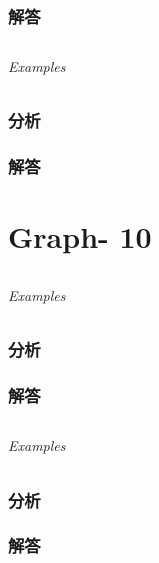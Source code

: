 \documentclass[UTF8,a4paper,12pt]{ctexbook}
\begin{document}
	\subsection{解答}
	
\section{}
	
	\subparagraph{Examples}
	
	\subsection{分析}
	
	\subsection{解答}
\chapter{Graph- 10}
\section{}
	
	\subparagraph{Examples}
	
	\subsection{分析}
	
	\subsection{解答}
	
\section{}
	
	\subparagraph{Examples}
	
	\subsection{分析}
	
	\subsection{解答}
	
\section{}
	
\end{document}
